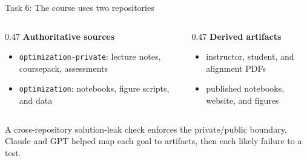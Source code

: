 \begin{frame}{Task 6: The course uses two repositories}
  \vfill
  \begin{columns}[t]
    \begin{column}{0.47\textwidth}
      \textbf{Authoritative sources}
      \begin{itemize}\small\setlength\itemsep{0.4em}
        \item \texttt{optimization-private}: lecture notes, coursepack, assessments
        \item \texttt{optimization}: notebooks, figure scripts, and data
      \end{itemize}
    \end{column}
    \begin{column}{0.47\textwidth}
      \textbf{Derived artifacts}
      \begin{itemize}\small\setlength\itemsep{0.4em}
        \item instructor, student, and alignment PDFs
        \item published notebooks, website, and figures
      \end{itemize}
    \end{column}
  \end{columns}
  \vspace{1.0em}
  \begin{center}\small
    A cross-repository solution-leak check enforces the private/public boundary.\\[0.35em]
    Claude and GPT helped map each goal to artifacts, then each likely failure to a test.
  \end{center}
  \vspace{1.0cm plus 1fill}
\end{frame}

